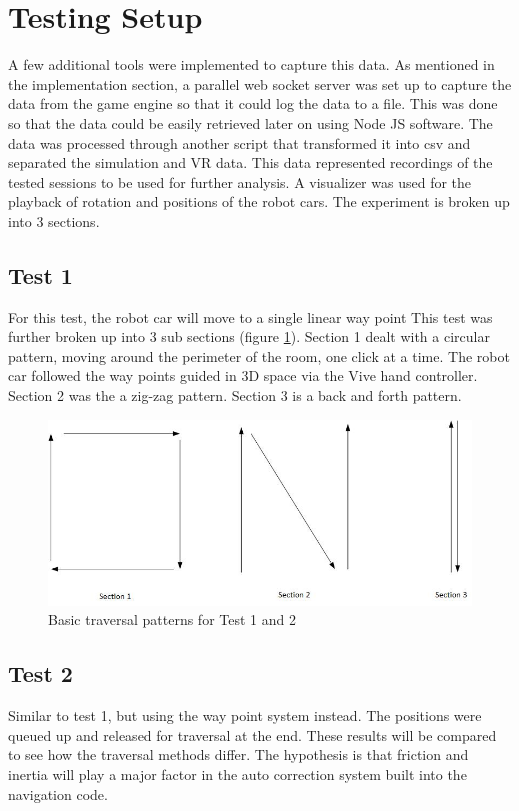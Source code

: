 \documentclass[10pt,a4paper]{article}
\begin{document}
	\section*{Testing Setup}
	A few additional tools were implemented to capture this data. As mentioned in the implementation section, a parallel web socket server was set up to capture the data from the game engine so that it could log the data to a file. This was done so that the data could be easily retrieved later on using Node JS software. The data was processed through another script that transformed it into csv and separated the simulation and VR data. This data represented recordings of the tested sessions to be used for further analysis. A visualizer was used for the playback of rotation and positions of the robot cars. The experiment is broken up into 3 sections.
	
	\subsection*{Test 1}
	For this test, the robot car will move to a single linear way point This test was further broken up into 3 sub sections (figure \ref{fig:traversal_patterns}). Section 1 dealt with a circular pattern, moving around the perimeter of the room, one click at a time. The robot car followed the way points guided in 3D space via the Vive hand controller. Section 2 was the a zig-zag pattern. Section 3 is a back and forth pattern.
		
	\begin{figure}
		\centering
		\includegraphics[width=.6\textwidth]{basic_traversal.jpg}
		\caption{Basic traversal patterns for Test 1 and 2}
		\label{fig:traversal_patterns}
	\end{figure}

	\subsection*{Test 2}
	Similar to test 1, but using the way point system instead. The positions were queued up and released for traversal at the end. These results will be compared to see how the traversal methods differ. The hypothesis is that friction and inertia will play a major factor in the auto correction system built into the navigation code.
	
\end{document}

